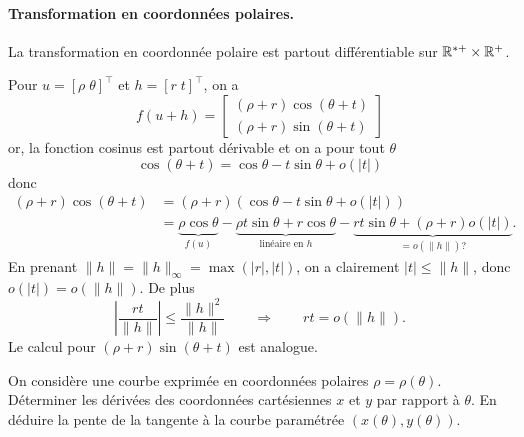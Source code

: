 \paragraph*{Transformation en coordonnées polaires.} 

\begin{proposition*}
  La transformation en coordonnée polaire est partout différentiable sur $\mathbb{R}^{*+} \times \mathbb{R}^+$.
\end{proposition*}

\proof
Pour $u = [\rho \; \theta]^\top$ et $h = [r \; t ]^\top$, on a
$$
f(u+h) = \left[\begin{array}{c} 
    (\rho+r) \cos(\theta +t) \\ (\rho+r) \sin(\theta +t) 
    \end{array} \right]
$$
or, la fonction cosinus est partout dérivable et on a pour tout $\theta$
$$
\cos(\theta +t) = \cos \theta - t \sin \theta + o(|t|)
$$
donc
\begin{align*}
  (\rho+r) \cos(\theta +t) 
  & =  (\rho+r) (\cos \theta - t \sin \theta + o(|t|)) \\
  & = \underset{f(u)}{\underbrace{\rho \cos \theta}} 
  - \underset{\text{linéaire en $h$}}{\underbrace{\rho t \sin \theta + r \cos \theta}} 
  - \underset{= o(\|h\|) ?}{\underbrace{rt \sin \theta + (\rho + r) o(|t|)}}.
\end{align*}
En prenant $\|h\| = \|h\|_\infty = \max(|r|, |t|)$, on a clairement $|t| \leq \|h\|$, donc $o(|t|) = o(\|h\|)$. De plus
$$
\left|\frac{rt}{\|h\|}\right| 
\leq \frac{\|h\|^2}{\|h\|}
\qquad \Rightarrow \qquad 
rt = o(\|h\|).
$$
Le calcul pour $(\rho+r) \sin(\theta +t)$ est analogue.
\eproof


\begin{exercise*}[A faire]
  On considère une courbe exprimée en coordonnées polaires $\rho = \rho(\theta)$. Déterminer les dérivées des coordonnées cartésiennes $x$ et $y$ par rapport à $\theta$. En déduire la pente de la tangente à la courbe paramétrée $(x(\theta), y(\theta))$.
\end{exercise*}

